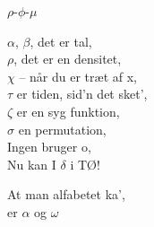 \begin{song}{$\rho$-$\phi$-$\mu$}
  \begin{SBVerse}
    $\alpha$, $\beta$, det er tal,\\
    $\rho$, det er en densitet,\\
    $\chi$ – når du er træt af x,\\
    $\tau$ er tiden, sid’n det sket’,\\
    $\zeta$ er en syg funktion,\\
    $\sigma$ en permutation,\\
    Ingen bruger o,\\
    Nu kan I $\delta$ i TØ!
  \end{SBVerse}

  \begin{SBSection*}
    At man alfabetet ka',\\
    er $\alpha$ og $\omega$
  \end{SBSection*}

\end{song}